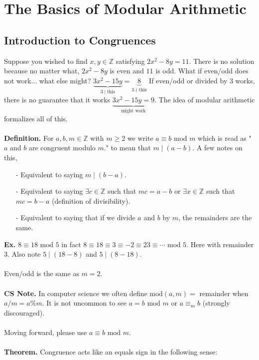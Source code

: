 \documentclass[class=article, crop=false]{standalone}
\def\integers{{\mathbb Z}}
\begin{document}
    
\section{The Basics of Modular Arithmetic}

\subsection{Introduction to Congruences}
Suppose you wished to find $x,y\in\integers$ satisfying $2x^2 -8y=11$. There is no solution
because no matter what, $2x^2 -8y$ is even and $11$ is odd. What if even/odd does not work...
what else might? $\underbrace{3x^2-15y}_{3\mid\text{this}}=\underbrace{8}_{3\nmid\text{this}}$
If even/odd or divided by 3 works, there is no guarantee that it works 
$\underbrace{3x^2-15y=9}_{\text{might work}}$.
The idea of modular arithmetic formalizes all of this.\\\\
\textbf{Definition.} For $a,b,m\in\integers$ with $m\geq2$ we write $a\equiv b\mbox{ mod }m$ which is
read as "$a$ and $b$ are congruent modulo $m$." to mean that $m\mid (a-b)$. A few notes on this,
\begin{itemize}
	\item[-] Equivalent to saying $m\mid (b-a)$.
	\item[-] Equivalent to saying $\exists c\in\integers$ such that $mc=a-b$ or $\exists x\in\integers$
	such that $mc=b-a$ (definition of divisibility).
	\item[-] Equivalent to saying that if we divide $a$ and $b$ by $m$, the remainders are the same.
\end{itemize}
\textbf{Ex.} $8\equiv 18\mbox{ mod } 5$ in fact $8\equiv18\equiv3\equiv-2\equiv23\equiv\cdots\mbox{ mod }5$.
Here with remainder 3. Also note $5\mid (18-8)$ and $5\mid (8-18)$.\\\\
Even/odd is the same as $m=2$.\\\\
\textbf{CS Note.} In computer science we often define $\mbox{mod}(a,m)= $ remainder when $a/m=a\%m$.
It is not uncommon to see $a=b\mbox{ mod }m$ or $a\equiv_m b$ (strongly discouraged).\\\\
Moving forward, please use $a\equiv b\mbox{ mod }m$.\\\\
\textbf{Theorem.} Congruence acts like an equals sign in the following sense:
\end{document}

